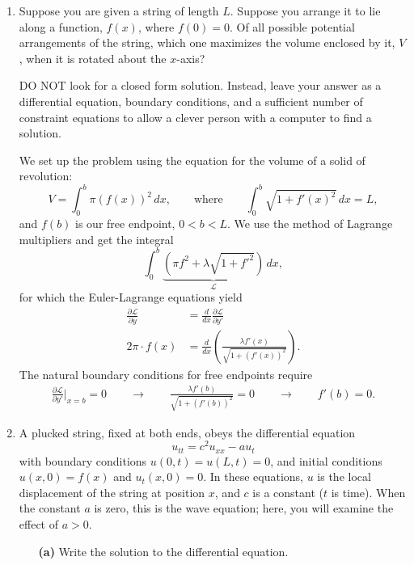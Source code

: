 \documentclass[10pt,letterpaper]{report}
\newcommand{\so}{\qquad \rightarrow \qquad}
\begin{document}
\begin{enumerate}
\item \begin{qbox}
Suppose you are given a string of length $L$. Suppose you arrange it to lie along a function, $f(x)$, where $f(0) = 0$. Of all possible potential arrangements of the string, which one maximizes the volume enclosed by it, $V$, when it is rotated about the $x$-axis?

DO NOT look for a closed form solution. Instead, leave your answer as a differential equation, boundary conditions, and a sufficient number of constraint equations to allow a clever
person with a computer to find a solution.
\end{qbox}

We set up the problem using the equation for the volume of a solid of revolution:
\[
V = \int_0^b \pi (f(x))^2\,dx, \qquad \textrm{where} \qquad \int_0^b \sqrt{1 + f'(x)^2}\,dx = L,
\]
and $f(b)$ is our free endpoint, $0 < b < L$. We use the method of Lagrange multipliers and get the integral
\[
\int_0^b \underbrace{\left(\pi f^2 + \lambda \sqrt{1 + f'^2}\right)}_{\mathcal L}\,dx,
\]
for which the Euler-Lagrange equations yield
\begin{align*}
    \frac{\partial \mathcal L}{\partial y}
    &=
    \frac{d}{dx}\frac{\partial \mathcal L}{\partial y'}
    \\
    2\pi \cdot f(x) 
    &= 
    \frac{d}{dx}\left(\frac{\lambda f'(x)}{\sqrt{1 + (f'(x))^2}}\right).
\end{align*}
The natural boundary conditions for free endpoints require
\begin{align*}
\frac{\partial \mathcal L}{\partial y'} \bigg\vert_{x = b} = 0
\so
\frac{\lambda f'(b)}{\sqrt{1 + (f'(b))^2}} = 0
\so
f'(b) = 0.
\end{align*}

\item \begin{qbox}
A plucked string, fixed at both ends, obeys the differential equation
\[
u_{tt} = c^2u_{xx} - au_t
\]
with boundary conditions $u(0,t) = u(L,t) = 0$, and initial conditions $u(x, 0) = f(x)$ and $u_t(x, 0) = 0$. In these equations, $u$ is the local displacement of the string at position $x$, and $c$ is a constant ($t$ is time). When the constant $a$ is zero, this is the wave equation; here, you will examine the effect of $a > 0$.
\begin{itemize}
    \item[\textbf{(a)}] Write the solution to the differential equation.
    

\end{itemize}
\end{qbox}
\end{enumerate}
\end{document}
